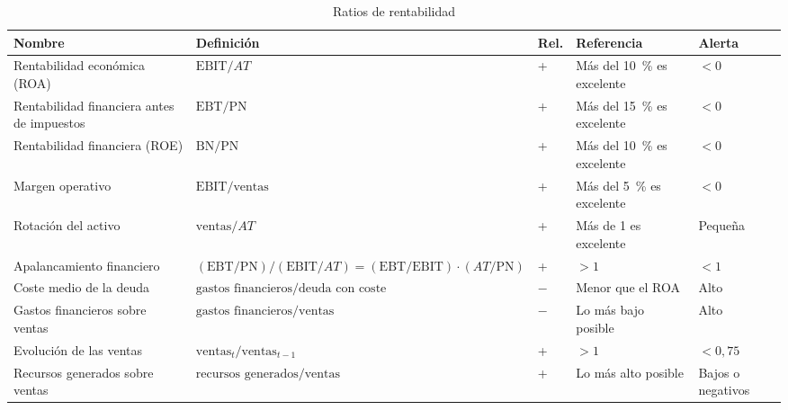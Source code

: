 \documentclass[11pt]{article}
\begin{document}
\begin{table}[H]
\centering
\caption{Ratios de rentabilidad}\label{tab:ratios-rentabilidad}
\footnotesize
\renewcommand{\arraystretch}{1.3}
\begin{tabular}{>{\raggedright\arraybackslash}m{3.1cm}>{\centering\arraybackslash}m{5.4cm}>{\centering\arraybackslash}m{0.9cm}>{\centering\arraybackslash}m{2.1cm}>{\centering\arraybackslash}m{2.4cm}}
\toprule
\rowcolor{tceeazulpalido}\textbf{Nombre} & \textbf{Definición} & \textbf{Rel.} & \textbf{Referencia} & \textbf{Alerta} \\
\midrule
Rentabilidad económica (ROA) & $\mathrm{EBIT}/AT$ & + & Más del 10~\% es excelente & $<0$ \\
Rentabilidad financiera antes de impuestos & $\mathrm{EBT}/\mathrm{PN}$ & + & Más del 15~\% es excelente & $<0$ \\
Rentabilidad financiera (ROE) & $\mathrm{BN}/\mathrm{PN}$ & + & Más del 10~\% es excelente & $<0$ \\
Margen operativo & $\mathrm{EBIT}/\allowbreak \text{ventas}$ & + & Más del 5~\% es excelente & $<0$ \\
Rotación del activo & $\text{ventas}/\allowbreak AT$ & + & Más de 1 es excelente & Pequeña \\
Apalancamiento financiero & $(\mathrm{EBT}/\mathrm{PN})/(\mathrm{EBIT}/AT)=(\mathrm{EBT}/\mathrm{EBIT})\cdot(AT/\mathrm{PN})$ & + & $>1$ & $<1$ \\
Coste medio de la deuda & $\text{gastos financieros}/\allowbreak \text{deuda con coste}$ & $-$ & Menor que el ROA & Alto \\
Gastos financieros sobre ventas & $\text{gastos financieros}/\allowbreak \text{ventas}$ & $-$ & Lo más bajo posible & Alto \\
Evolución de las ventas & $\text{ventas}_t/\allowbreak \text{ventas}_{t-1}$ & + & $>1$ & $<0{,}75$ \\
Recursos generados sobre ventas & $\text{recursos generados}/\allowbreak \text{ventas}$ & + & Lo más alto posible & Bajos o negativos \\
\bottomrule
\end{tabular}
\end{table}
\end{document}
